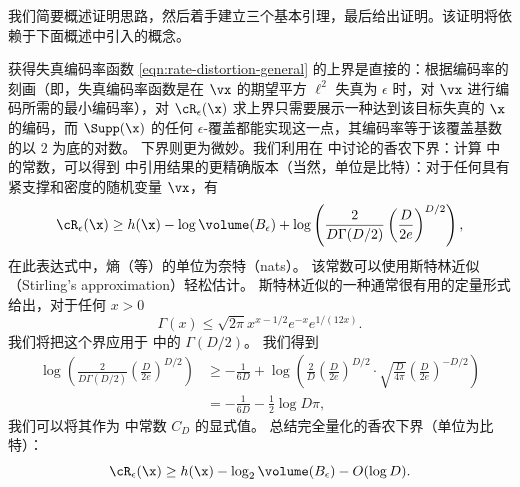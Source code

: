 \documentclass[../../book-main_zh.tex]{subfiles}
\begin{document}
我们简要概述证明思路，然后着手建立三个基本引理，最后给出证明。该证明将依赖于下面概述中引入的概念。

获得失真编码率函数 \eqref{eqn:rate-distortion-general} 的上界是直接的：根据编码率的刻画（即，失真编码率函数是在 $\vx$ 的期望平方 $\ell^2$ 失真为 $\epsilon$ 时，对 $\vx$ 进行编码所需的最小编码率），对 $\cR_{\epsilon}(\x)$ 求上界只需要展示一种达到该目标失真的 $\x$ 的编码，而 $\Supp(\x)$ 的任何 $\epsilon$-覆盖都能实现这一点，其编码率等于该覆盖基数的以 $2$ 为底的对数。
下界则更为微妙。我们利用在  中讨论的香农下界：计算 \cite[\S III, (22)]{Linder1994-ej} 中的常数，可以得到  中引用结果的更精确版本（当然，单位是比特）：对于任何具有紧支撑和密度的随机变量 $\vx$，有
\begin{equation}\label{eq:slb-appendix-1}
    \cR_{\epsilon}(\x)
    \geq
    h(\x)
    - \log \volume(B_{\epsilon})
    +
    \log
    \left(
        \frac{
            2
        }
        {
            D \Gamma(D/2)
        }
        \left(
            \frac{
                D
            }
            {
                2e
            }
        \right)^{D/2}
    \right),
\end{equation}
在此表达式中，熵（等）的单位为奈特（nats）。
该常数可以使用斯特林近似（Stirling's approximation）轻松估计。
斯特林近似的一种通常很有用的定量形式给出，对于任何 $x > 0$ \cite{Jameson2015-hy}
\begin{equation}
    \Gamma(x) \leq \sqrt{2\pi} x^{x - 1/2} e^{-x} e^{1/(12x)}.
\end{equation}
我们将把这个界应用于  中的 $\Gamma(D/2)$。
我们得到
\begin{align}
    \log
    \left(
        \frac{
            2
        }
        {
            D \Gamma(D/2)
        }
        \left(
            \frac{
                D
            }
            {
                2e
            }
        \right)^{D/2}
    \right)
    &\geq
    -\frac{1}{6D}
    +
    \log\left(
        \frac{2}{D}
        \left(
            \frac{
                D
            }
            {
                2e
            }
        \right)^{D/2}
        \cdot
        \sqrt{\frac{D}{4\pi}}
        \left(
            \frac{D}{2e}
        \right)^{-D/2}
    \right)
    \\
    &=
    -\frac{1}{6D}
    - \frac{1}{2}\log D\pi,\label{eq:slb-constant-est}
\end{align}
我们可以将其作为  中常数 $C_D$ 的显式值。
总结完全量化的香农下界（单位为比特）：
\begin{equation}\label{eq:slb-appendix}
    \cR_{\epsilon}(\x)
    \geq
    h(\x)
    - \log_2 \volume(B_{\epsilon})
    - O(\log D).
\end{equation}
\end{document}
